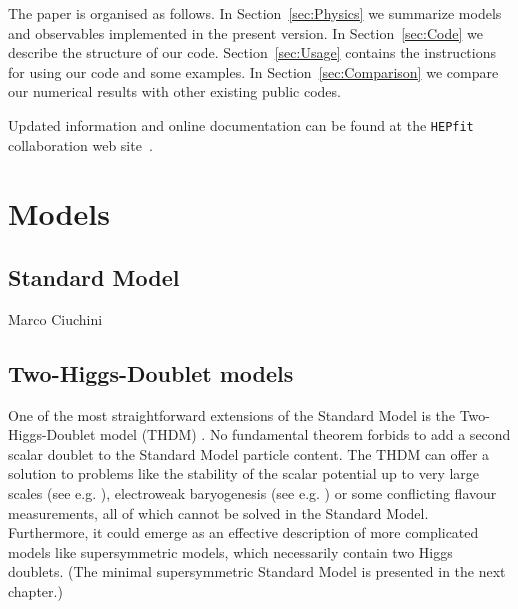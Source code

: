 \documentclass[aps,superscriptaddress,nofootinbib,floatfix,notitlepage]{revtex4-1}
\newcommand{\HEPfit}{\texttt{HEPfit}\xspace}
\begin{document}
The paper is organised as follows. In Section~\ref{sec:Physics} we
summarize models and observables implemented in the present
version. In Section~\ref{sec:Code} we describe the structure of our
code. Section~\ref{sec:Usage} contains the instructions for using our
code and some examples. In Section~\ref{sec:Comparison} we compare our
numerical results with other existing public codes.

Updated information and online documentation can be found at the
\HEPfit collaboration web site~\cite{website}.




\section{Models}
\label{sec:Models}

\subsection{Standard Model}
\label{sec:SM}
Marco Ciuchini

\subsection{Two-Higgs-Doublet models}
\label{sec:THDM}

One of the most straightforward extensions of the Standard Model is the Two-Higgs-Doublet model (THDM) \cite{Lee:1973iz,Gunion:2002zf,Branco:2011iw}. No fundamental theorem forbids to add a second scalar doublet to the Standard Model particle content. The THDM can offer a solution to problems like the stability of the scalar potential up to very large scales (see e.g. \cite{Chowdhury:2015yja}), electroweak baryogenesis (see e.g. \cite{Bochkarev:1990fx,Nelson:1991ab,Dorsch:2013wja}) or some conflicting flavour measurements, all of which cannot be solved in the Standard Model. Furthermore, it could emerge as an effective description of more complicated models like supersymmetric models, which necessarily contain two Higgs doublets. (The minimal supersymmetric Standard Model is presented in the next chapter.)
\end{document}
